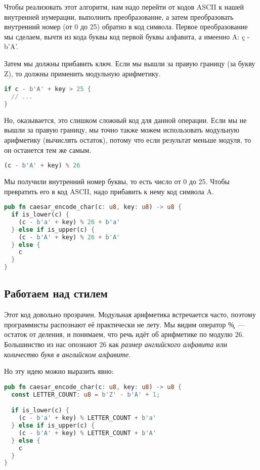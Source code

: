 Чтобы реализовать этот алгоритм, нам надо перейти от кодов ASCII к нашей внутренней нумерации, выполнить преобразование, а затем преобразовать внутренний номер (от 0 до 25) обратно в код символа.
Первое преобразование мы сделаем, вычтя из кода буквы код первой буквы алфавита, а имеенно A: \c{c - b'A'}.

Затем мы должны прибавить ключ.
Если мы вышли за правую границу (за букву Z), то должны применить модульную арифметику.

\begin{lstlisting}[language=Rust]
if c - b'A' + key > 25 {
  // ...
}
\end{lstlisting}

Но, оказывается, это слишком сложный код для данной операции.
Если мы не вышли за правую границу, мы точно также можем использовать модульную арифметику (вычислять остаток), потому что если результат меньше модуля, то он останется тем же самым.

\begin{lstlisting}[language=Rust]
(c - b'A' + key) % 26
\end{lstlisting}

Мы получили внутренний номер буквы, то есть число от 0 до 25. Чтобы превратить его в код ASCII, надо прибавить к нему код символа A.

\begin{lstlisting}[language=Rust]
pub fn caesar_encode_char(c: u8, key: u8) -> u8 {
  if is_lower(c) {
    (c - b'a' + key) % 26 + b'a'
  } else if is_upper(c) {
    (c - b'A' + key) % 26 + b'A'
  } else {
    c
  }
}
\end{lstlisting}

\subsection{Работаем над стилем}

Этот код довольно прозрачен.
Модульная арифметика встречается часто, поэтому программисты распознают её практически не лету.
Мы видим оператор \c{\%}~--- остаток от деления, и понимаем, что речь идёт об арифметике по модулю 26.
Большинство из нас опознают 26 как {\em размер английского алфавита} или {\em количество букв в английском алфавите}.

Но эту идею можно выразить явно:

\begin{lstlisting}[language=Rust]
pub fn caesar_encode_char(c: u8, key: u8) -> u8 {
  const LETTER_COUNT: u8 = b'Z' - b'A' + 1;

  if is_lower(c) {
    (c - b'a' + key) % LETTER_COUNT + b'a'
  } else if is_upper(c) {
    (c - b'A' + key) % LETTER_COUNT + b'A'
  } else {
    c
  }
}
\end{lstlisting}

